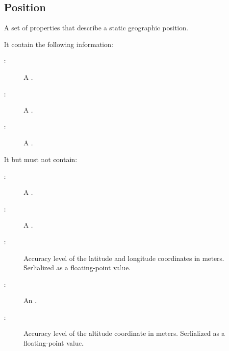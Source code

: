 \documentclass[letterpaper,10pt,english]{sphinxmanual}
\begin{document}
\subsection{Position}
\label{\detokenize{taxonomy_serialization:position}}\label{\detokenize{taxonomy_serialization:id7}}
A set of properties that describe a static geographic position.

It  contain the following information:
\begin{description}
\item[{:}] \leavevmode
A {\hyperref[\detokenize{taxonomy_serialization:latitude}]{}}.

\item[{:}] \leavevmode
A {\hyperref[\detokenize{taxonomy_serialization:longitude}]{}}.

\item[{:}] \leavevmode
A {\hyperref[\detokenize{taxonomy_serialization:moment}]{}}.

\end{description}

It  but must not contain:
\begin{description}
\item[{:}] \leavevmode
A {\hyperref[\detokenize{taxonomy_serialization:heading}]{}}.

\item[{:}] \leavevmode
A {\hyperref[\detokenize{taxonomy_serialization:speed}]{}}.

\item[{:}] \leavevmode
Accuracy level of the latitude and longitude coordinates in meters.
Serlialized as a floating-point value.

\item[{:}] \leavevmode
An {\hyperref[\detokenize{taxonomy_serialization:altitude}]{}}.

\item[{:}] \leavevmode
Accuracy level of the altitude coordinate in meters.
Serlialized as a floating-point value.

\end{description}
\end{document}
